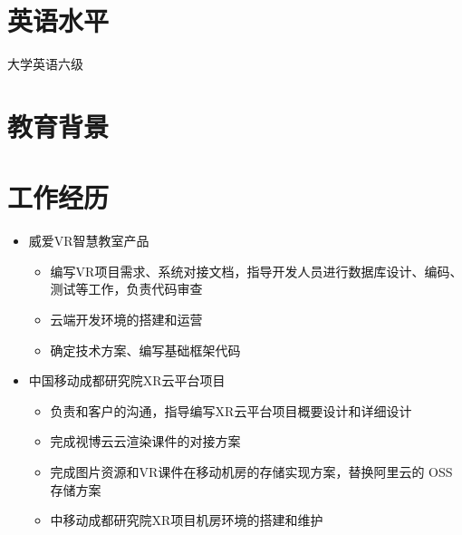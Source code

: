 \documentclass{resume}
\begin{document}
\section{英语水平}
大学英语六级

\section{教育背景}

\par

\section{工作经历}
\begin{itemize}
  \item 威爱VR智慧教室产品
  \begin{itemize}
    \item 编写VR项目需求、系统对接文档，指导开发人员进行数据库设计、编码、测试等工作，负责代码审查
    \item 云端开发环境的搭建和运营
    \item 确定技术方案、编写基础框架代码
  \end{itemize}
  \item 中国移动成都研究院XR云平台项目
  \begin{itemize}
    \item 负责和客户的沟通，指导编写XR云平台项目概要设计和详细设计
    \item 完成视博云云渲染课件的对接方案
    \item 完成图片资源和VR课件在移动机房的存储实现方案，替换阿里云的 OSS存储方案
    \item 中移动成都研究院XR项目机房环境的搭建和维护
  \end{itemize}
\end{itemize}
\end{document}
